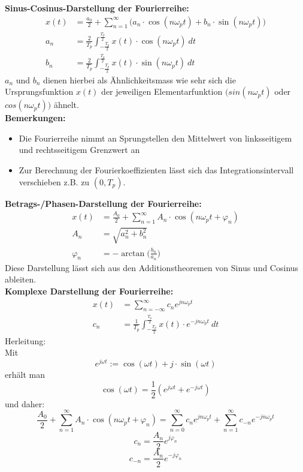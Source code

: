 \documentclass[12pt,a4paper]{scrartcl}
\begin{document}
\noindent  \textbf{Sinus-Cosinus-Darstellung der Fourierreihe:}
\begin{equation}
  \label{eq:1}
  \begin{split}
  x(t) &=\frac{a_0}{2} + \sum_{n=1}^{\infty}\big(a_n \cdot \cos(n \omega_p t) + b_n \cdot \sin(n \omega_p t)   \big)  \\
a_n &= \frac{2}{T_p} \int_{-\frac{T_p}{2}}^{\frac{T_p}{2}} x(t) \cdot \cos(n\omega_p t)\ dt \\
b_n &= \frac{2}{T_p} \int_{-\frac{T_p}{2}}^{\frac{T_p}{2}} x(t) \cdot \sin(n\omega_p t)\ dt
    \end{split}
\end{equation}
\noindent $a_n$ und $b_n$ dienen hierbei als Ähnlichkeitsmass wie sehr sich die Ursprungsfunktion $x(t)$ der jeweiligen Elementarfunktion $\big(sin(n\omega_p t)$ oder $cos(n\omega_p t)\big)$ ähnelt.\\

\noindent \textbf{Bemerkungen:}
    \begin{itemize}
      \item Die Fourierreihe nimmt an Sprungstellen den Mittelwert von linksseitigem und rechtsseitigem Grenzwert an
      \item Zur Berechnung der Fourierkoeffizienten lässt sich das Integrationsintervall verschieben z.B. zu $(0,T_p)$. \\
    \end{itemize} 

    \noindent \textbf{Betrags-/Phasen-Darstellung der Fourierreihe:}
\begin{equation}
    \label{eq:2}
    \begin{split}
    x(t) &=\frac{A_0}{2} + \sum_{n=1}^{\infty} A_n \cdot \cos(n \omega_p t + \varphi_n)  \\
  A_n &= \sqrt{a^2_n + b^2_n} \\
  \varphi_n &= -\arctan\bigg(\frac{b_n}{a_n}\bigg)
      \end{split}
  \end{equation}
  \noindent Diese Darstellung lässt sich aus den Additionstheoremen von Sinus und Cosinus ableiten. \\

  \noindent \textbf{Komplexe Darstellung der Fourierreihe:}
  \begin{equation}
    \label{eq:3}
    \begin{split}
    x(t) &= \sum_{n= -\infty}^{\infty} c_n e^{jn\omega_p t}\\
    c_n &= \frac{1}{T_p} \int_{-\frac{T_p}{2}}^{\frac{T_p}{2}} x(t) \cdot e^{-jn\omega_p t}\ dt
    \end{split}
  \end{equation}
  \noindent Herleitung: \\
  Mit 
  $$e^{j\omega t} := \cos(\omega t) + j\cdot \sin(\omega t)$$ erhält man $$\cos(\omega t) = \frac{1}{2}(e^{j\omega t} +  e^{-j\omega t})$$ 
  und daher:
  $$\frac{A_0}{2} + \sum_{n=1}^{\infty} A_n \cdot \cos(n \omega_p t + \varphi_n) =  \sum_{n=0}^{\infty}c_n e^{jn\omega_p t} +  \sum_{n=1}^{\infty}c_{-n}e^{-jn\omega_p t}$$
  $$c_n = \frac{A_n}{2} e^{j\varphi_n}$$
  $$ c_{-n} = \frac{A_n}{2} e^{-j\varphi_n}$$ 
\end{document}
